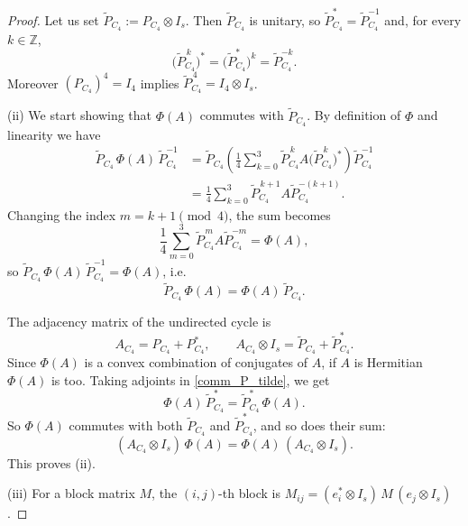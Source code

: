 \documentclass[11pt, a4paper]{article}
\theoremstyle{plain}
\theoremstyle{definition}
\theoremstyle{remark}
\newcommand{\Z}{\mathbb{Z}}
\begin{document}
\begin{proof}
Let us set \(\widetilde P_{C_4} := P_{C_4}\otimes I_s\).  
Then \(\widetilde P_{C_4}\) is unitary, so \(\widetilde P^*_{C_4}=\widetilde P^{-1}_{C_4}\) and,
for every \(k \in \Z\),
\[
\bigl(\widetilde P_{C_4}^{\,k}\bigr)^*
= \bigl(\widetilde P_{C_4}^*\bigr)^{k}
= \widetilde P_{C_4}^{-k}.
\]
Moreover \((P_{C_4})^4 = I_4\) implies \(\widetilde P_{C_4}^{\,4} = I_4\otimes I_s\).


\smallskip

(ii) 
We start showing that \(\Phi(A)\) commutes with \(\widetilde P_{C_4}\).
By definition of \(\Phi\) and linearity we have
\begin{align*}
\widetilde P_{C_4}\,\Phi(A)\,\widetilde P_{C_4}^{-1}
&= \widetilde P_{C_4} \left( \frac{1}{4}\sum_{k=0}^{3} 
\widetilde P_{C_4}^{\,k} A \bigl(\widetilde P_{C_4}^{\,k}\bigr)^{*} \right) \widetilde P_{C_4}^{-1} \\
&= \frac14 \sum_{k=0}^3 
\widetilde P_{C_4}^{\,k+1} A \widetilde P_{C_4}^{-(k+1)}.
\end{align*}
Changing the index \(m=k+1 \pmod 4\), the sum becomes
\[
\frac14 \sum_{m=0}^3 \widetilde P_{C_4}^{\,m} A \widetilde P_{C_4}^{-m} = \Phi(A),
\]
so \(\widetilde P_{C_4}\,\Phi(A)\,\widetilde P_{C_4}^{-1}=\Phi(A)\), i.e. 
\begin{equation}\label{comm_P_tilde}
    \widetilde P_{C_4}\,\Phi(A)=\Phi(A)\,\widetilde P_{C_4}.
\end{equation}

The adjacency matrix of the undirected cycle is
\[
A_{C_4} = P_{C_4} + P_{C_4}^*,
\qquad
A_{C_4}\otimes I_s
= \widetilde P_{C_4} + \widetilde P_{C_4}^{*}.
\]
Since \(\Phi(A)\) is a convex combination of conjugates of \(A\), if \(A\) is Hermitian \(\Phi(A)\) is too. Taking adjoints in \eqref{comm_P_tilde}, we get
\[
\Phi(A)\,\widetilde P_{C_4}^{*} = \widetilde P_{C_4}^{*} \,\Phi(A).
\]
So \(\Phi(A)\) commutes with both \(\widetilde P_{C_4}\) and \(\widetilde P_{C_4}^{*}\), and so does their sum:
\[
(A_{C_4}\otimes I_s)\,\Phi(A)
= \Phi(A)\,(A_{C_4}\otimes I_s).
\]
This proves (ii).

\smallskip

(iii)
For a block matrix \(M\), the \((i,j)\)-th block is
\(M_{ij}=(e_i^*\otimes I_s)\,M\,(e_j\otimes I_s)\).


\end{proof}
\end{document}
